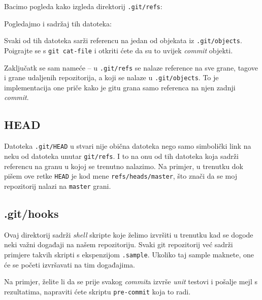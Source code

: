Bacimo pogleda kako izgleda direktorij \verb+.git/refs+:



Pogledajmo i sadržaj tih datoteka:



Svaki od tih datoteka sarži referencu na jedan od objekata iz \verb+.git/objects+. 
Poigrajte se s \verb+git cat-file+ i otkriti ćete da su to uvijek \emph{commit} objekti.

Zaključatk se sam nameće -- u \verb+.git/refs+ se nalaze reference na sve grane, tagove i grane udaljenih repozitorija, a koji se nalaze u \verb+.git/objects+.
To je implementacija one priče kako je gitu grana samo referenca na njen zadnji \emph{commit}.

\subsection*{HEAD}

Datoteka \verb+.git/HEAD+ u stvari nije obična datoteka nego samo simbolički link na neku od datoteka unutar \verb+git/refs+.
I to na onu od tih datoteka koja sadrži referencu na granu u kojoj se trenutno nalazimo.
Na primjer, u trenutku dok pišem ove retke \verb+HEAD+ je kod mene \verb+refs/heads/master+, što znači da se moj repozitorij nalazi na \verb+master+ grani.

\subsection*{.git/hooks}

Ovaj direktorij sadrži \emph{shell} skripte koje želimo izvršiti u trenutku kad se dogode neki važni događaji na našem repozitoriju.
Svaki git repozitorij već sadrži primjere takvih skripti s ekspenzijom \verb+.sample+.
Ukoliko taj sample maknete, one će se početi izvršavati na tim događajima.

Na primjer, želite li da se prije svakog \emph{commit}a izvrše \emph{unit} testovi i pošalje mejl s rezultatima, napraviti ćete skriptu \verb+pre-commit+ koja to radi.


